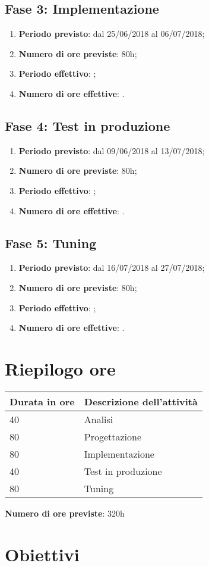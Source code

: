 \documentclass[Tesi.tex]{subfiles}
\begin{document}
\subsection{Fase 3: Implementazione}
\begin{enumerate}
	\item \textbf{Periodo previsto}: dal 25/06/2018 al 06/07/2018;
	\item \textbf{Numero di ore previste}: 80h;
	\item \textbf{Periodo effettivo}: ;
	\item \textbf{Numero di ore effettive}: .
	
	
\end{enumerate}

\subsection{Fase 4: Test in produzione}
\begin{enumerate}
	\item \textbf{Periodo previsto}: dal 09/06/2018 al 13/07/2018;
	\item \textbf{Numero di ore previste}: 80h;
	\item \textbf{Periodo effettivo}: ;
	\item \textbf{Numero di ore effettive}: .
	
	
\end{enumerate}

\subsection{Fase 5: Tuning}
\begin{enumerate}
	\item \textbf{Periodo previsto}: dal 16/07/2018 al 27/07/2018;
	\item \textbf{Numero di ore previste}: 80h;
	\item \textbf{Periodo effettivo}: ;
	\item \textbf{Numero di ore effettive}: .
	
	
\end{enumerate}

\section{Riepilogo ore}
    \begin{longtable}{|p{3cm}|p{10cm}|}
	\hline
	{\bf Durata in ore} & {\bf Descrizione dell'attività} \\
	\hline
	40 & Analisi \\
	\hline
	80 & Progettazione \\
	\hline
	80 & Implementazione \\
	\hline
	40 & Test in produzione \\
	\hline
	80 & Tuning \\
	\hline
	
\end{longtable}

\textbf{Numero di ore previste}: 320h

\section{Obiettivi} %
\end{document}
